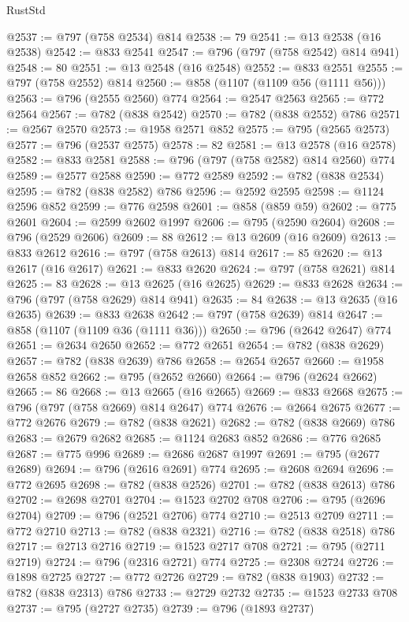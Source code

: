 \begin{lexlean}{RustStd}
\begin{coremodule}
@2537 := @797 (@758 @2534) @814
@2538 := 79
@2541 := @13 @2538 (@16 @2538)
@2542 := @833 @2541
@2547 := @796 (@797 (@758 @2542) @814 @941)
@2548 := 80
@2551 := @13 @2548 (@16 @2548)
@2552 := @833 @2551
@2555 := @797 (@758 @2552) @814
@2560 := @858 (@1107 (@1109 @56 (@1111 @56)))
@2563 := @796 (@2555 @2560) @774
@2564 := @2547 @2563
@2565 := @772 @2564
@2567 := @782 (@838 @2542)
@2570 := @782 (@838 @2552) @786
@2571 := @2567 @2570
@2573 := @1958 @2571 @852
@2575 := @795 (@2565 @2573)
@2577 := @796 (@2537 @2575)
@2578 := 82
@2581 := @13 @2578 (@16 @2578)
@2582 := @833 @2581
@2588 := @796 (@797 (@758 @2582) @814 @2560) @774
@2589 := @2577 @2588
@2590 := @772 @2589
@2592 := @782 (@838 @2534)
@2595 := @782 (@838 @2582) @786
@2596 := @2592 @2595
@2598 := @1124 @2596 @852
@2599 := @776 @2598
@2601 := @858 (@859 @59)
@2602 := @775 @2601
@2604 := @2599 @2602 @1997
@2606 := @795 (@2590 @2604)
@2608 := @796 (@2529 @2606)
@2609 := 88
@2612 := @13 @2609 (@16 @2609)
@2613 := @833 @2612
@2616 := @797 (@758 @2613) @814
@2617 := 85
@2620 := @13 @2617 (@16 @2617)
@2621 := @833 @2620
@2624 := @797 (@758 @2621) @814
@2625 := 83
@2628 := @13 @2625 (@16 @2625)
@2629 := @833 @2628
@2634 := @796 (@797 (@758 @2629) @814 @941)
@2635 := 84
@2638 := @13 @2635 (@16 @2635)
@2639 := @833 @2638
@2642 := @797 (@758 @2639) @814
@2647 := @858 (@1107 (@1109 @36 (@1111 @36)))
@2650 := @796 (@2642 @2647) @774
@2651 := @2634 @2650
@2652 := @772 @2651
@2654 := @782 (@838 @2629)
@2657 := @782 (@838 @2639) @786
@2658 := @2654 @2657
@2660 := @1958 @2658 @852
@2662 := @795 (@2652 @2660)
@2664 := @796 (@2624 @2662)
@2665 := 86
@2668 := @13 @2665 (@16 @2665)
@2669 := @833 @2668
@2675 := @796 (@797 (@758 @2669) @814 @2647) @774
@2676 := @2664 @2675
@2677 := @772 @2676
@2679 := @782 (@838 @2621)
@2682 := @782 (@838 @2669) @786
@2683 := @2679 @2682
@2685 := @1124 @2683 @852
@2686 := @776 @2685
@2687 := @775 @996
@2689 := @2686 @2687 @1997
@2691 := @795 (@2677 @2689)
@2694 := @796 (@2616 @2691) @774
@2695 := @2608 @2694
@2696 := @772 @2695
@2698 := @782 (@838 @2526)
@2701 := @782 (@838 @2613) @786
@2702 := @2698 @2701
@2704 := @1523 @2702 @708
@2706 := @795 (@2696 @2704)
@2709 := @796 (@2521 @2706) @774
@2710 := @2513 @2709
@2711 := @772 @2710
@2713 := @782 (@838 @2321)
@2716 := @782 (@838 @2518) @786
@2717 := @2713 @2716
@2719 := @1523 @2717 @708
@2721 := @795 (@2711 @2719)
@2724 := @796 (@2316 @2721) @774
@2725 := @2308 @2724
@2726 := @1898 @2725
@2727 := @772 @2726
@2729 := @782 (@838 @1903)
@2732 := @782 (@838 @2313) @786
@2733 := @2729 @2732
@2735 := @1523 @2733 @708
@2737 := @795 (@2727 @2735)
@2739 := @796 (@1893 @2737)

\end{coremodule}
\end{lexlean}
